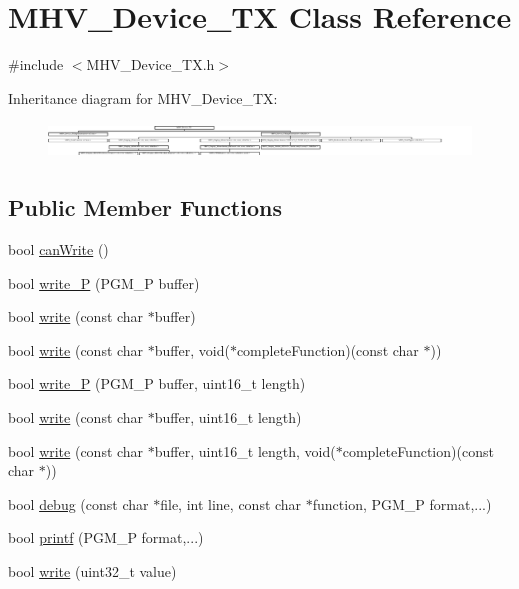 \hypertarget{class_m_h_v___device___t_x}{\section{M\-H\-V\-\_\-\-Device\-\_\-\-T\-X Class Reference}
\label{class_m_h_v___device___t_x}
}


{\ttfamily \#include $<$M\-H\-V\-\_\-\-Device\-\_\-\-T\-X.\-h$>$}

Inheritance diagram for M\-H\-V\-\_\-\-Device\-\_\-\-T\-X\-:\begin{figure}[H]
\begin{center}
\leavevmode
\includegraphics[height=0.975610cm]{class_m_h_v___device___t_x}
\end{center}
\end{figure}
\subsection*{Public Member Functions}
\begin{DoxyCompactItemize}
\item 
bool \hyperlink{class_m_h_v___device___t_x_a8fe33d10a27066c0f2e3f2339230692b}{can\-Write} ()
\item 
bool \hyperlink{class_m_h_v___device___t_x_ae3385162a92a95687c2021fe222748f1}{write\-\_\-\-P} (P\-G\-M\-\_\-\-P buffer)
\item 
bool \hyperlink{class_m_h_v___device___t_x_ab24711b24c91592e0b86760820fd0d64}{write} (const char $\ast$buffer)
\item 
bool \hyperlink{class_m_h_v___device___t_x_a26a2e5e2c013300f9d870c8007980825}{write} (const char $\ast$buffer, void($\ast$complete\-Function)(const char $\ast$))
\item 
bool \hyperlink{class_m_h_v___device___t_x_a24a8e3b10463bc08579f8707abb25fbe}{write\-\_\-\-P} (P\-G\-M\-\_\-\-P buffer, uint16\-\_\-t length)
\item 
bool \hyperlink{class_m_h_v___device___t_x_a0f909191e9d73244be62d0b162f1567a}{write} (const char $\ast$buffer, uint16\-\_\-t length)
\item 
bool \hyperlink{class_m_h_v___device___t_x_ae723c03cb89924b25c150b9a48e444dc}{write} (const char $\ast$buffer, uint16\-\_\-t length, void($\ast$complete\-Function)(const char $\ast$))
\item 
bool \hyperlink{class_m_h_v___device___t_x_a22f48a92047d5358ff2b48834aa8d3cf}{debug} (const char $\ast$file, int line, const char $\ast$function, P\-G\-M\-\_\-\-P format,...)
\item 
bool \hyperlink{class_m_h_v___device___t_x_a42c021c405f8f4b37db1a07a6853f8e8}{printf} (P\-G\-M\-\_\-\-P format,...)
\item 
bool \hyperlink{class_m_h_v___device___t_x_a985d3f2abde51de9c3fc634647830b03}{write} (uint32\-\_\-t value)
\end{DoxyCompactItemize}

